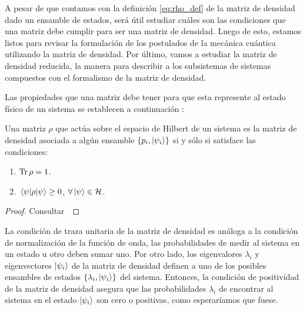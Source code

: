 A pesar de que contamos con la definición \eqref{eq:rho_def} de 
la matriz de densidad dado un ensamble de estados, será útil 
estudiar cuáles son las condiciones que una matriz debe cumplir 
para ser una matriz de densidad. Luego de esto, estamos listos 
para revisar la formulación de los postulados de la mecánica cuántica
utilizando la matriz de densidad. Por último, vamos a estudiar la
matriz de densidad reducida, la manera para describir a los
subsistemas de sistemas compuestos con el formalismo 
de la matriz de densidad.

Las propiedades que una matriz debe tener para que esta represente al 
estado físico de un sistema se establecen a continuación
\cite{nielsen_chuang_2011}:
\begin{thm}\label{teo:density-operator}
Una matriz $\rho$  que actúa sobre el espacio de Hilbert de un sistema 
es la matriz de densidad asociada a algún ensamble 
$\{p_i, \ket{\psi _i} \}$ si y sólo si satisface las condiciones:
\begin{enumerate}
\item $\Tr \rho = 1$.
\item $\matrixel{\psi}{\rho}{\psi} \geq 0$, $\forall\ket{\psi} \in \mathcal{H}$.
\end{enumerate}	
\end{thm} 
\begin{proof} Consultar~\cite[p.~101]{nielsen_chuang_2011} \end{proof}

La condición de traza unitaria de la matriz de densidad es análoga
a la condición de normalización de la función de onda, las probabilidades
de medir al sistema en un estado u otro deben sumar uno. 
Por otro lado, los eigenvalores $\lambda_i$ y eigenvectores $\ket{\psi_i}$ de la 
matriz de densidad definen a uno de los posibles ensambles de estados
$\{\lambda_i, \ket{\psi_i} \}$ del sistema. Entonces,
la condición de positividad de la matriz de densidad asegura que las
probabilidades $\lambda_i$ de encontrar al sistema en el estado $\ket{\psi_i}$
son cero o positivas, como esperaríamos que fuese. 

